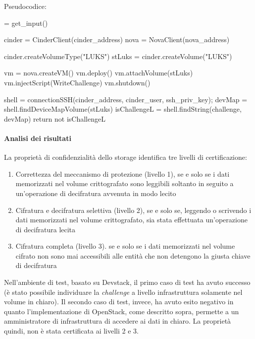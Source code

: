 \documentclass[../main.tex]{subfiles}
\begin{document}
\begin{itemize}
Pseudocodice:

\begin{python}
 = get_input()

cinder = CinderClient(cinder_address)
nova = NovaClient(nova_address)

cinder.createVolumeType("LUKS")
stLuks = cinder.createVolume("LUKS")

vm = nova.createVM()
vm.deploy()
vm.attachVolume(stLuks)
vm.injectScript(WriteChallenge)
vm.shutdown()

shell = connectionSSH(cinder_address, cinder_user, ssh_priv_key);
devMap = shell.findDeviceMapVolume(stLuks)
isChallengeL = shell.findString(challenge, devMap)
return not isChallengeL
\end{python}

\end{itemize}
\paragraph{Analisi dei risultati}
La proprietà di confidenzialità dello storage identifica tre livelli di certificazione:
\begin{enumerate}
\item Correttezza del meccanismo di protezione (livello 1), se e solo se i dati memorizzati nel volume crittografato sono leggibili soltanto in seguito a un'operazione di decifratura avvenuta in modo lecito
\item Cifratura e decifratura selettiva (livello 2), se e solo se, leggendo o scrivendo i dati memorizzati nel volume crittografato, sia stata effettuata un'operazione di decifratura lecita
\item Cifratura completa (livello 3). se e solo se i dati memorizzati nel volume cifrato non sono mai accessibili alle entità che non detengono la giusta chiave di decifratura
\end{enumerate}
Nell'ambiente di test, basato su Devstack, il primo caso di test ha avuto successo (è stato possibile individuare la \textit{challenge} a livello infrastruttura solamente nel volume in chiaro).
Il secondo caso di test, invece, ha avuto esito negativo in quanto l'implementazione di OpenStack, come descritto sopra, permette a un amministratore di infrastruttura di accedere ai dati in chiaro.
La proprietà quindi, non è stata certificata ai livelli 2 e 3.
\end{document}
